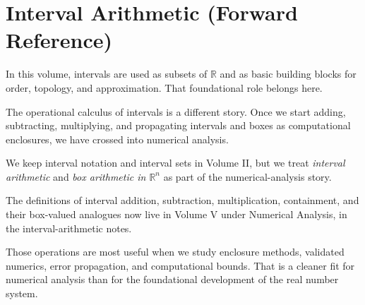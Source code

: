 
\section{Interval Arithmetic (Forward Reference)}

\begin{exposition}
In this volume, intervals are used as subsets of $\mathbb{R}$ and as basic
building blocks for order, topology, and approximation. That foundational
role belongs here.
\end{exposition}

\begin{exposition}
The operational calculus of intervals is a different story. Once we start
adding, subtracting, multiplying, and propagating intervals and boxes as
computational enclosures, we have crossed into numerical analysis.
\end{exposition}

\begin{remark*}
We keep interval notation and interval sets in Volume II, but we treat
\emph{interval arithmetic} and \emph{box arithmetic in $\mathbb{R}^n$} as
part of the numerical-analysis story.
\end{remark*}

\begin{remark*}
The definitions of interval addition, subtraction, multiplication,
containment, and their box-valued analogues now live in Volume V under
Numerical Analysis, in the interval-arithmetic notes.
\end{remark*}

\begin{remark*}
Those operations are most useful when we study enclosure methods, validated
numerics, error propagation, and computational bounds. That is a cleaner fit
for numerical analysis than for the foundational development of the real
number system.
\end{remark*}
